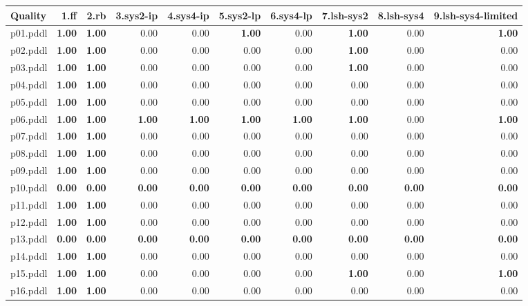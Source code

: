\documentclass{article}
\begin{document}
\begin{tabular}{@{}lrrrrrrrrr@{}}
Quality & 1.ff & 2.rb & 3.sys2-ip & 4.sys4-ip & 5.sys2-lp & 6.sys4-lp & 7.lsh-sys2 & 8.lsh-sys4 & 9.lsh-sys4-limited \\
\midrule
p01.pddl & \textbf{1.00} & \textbf{1.00} & 0.00 & 0.00 & \textbf{1.00} & 0.00 & \textbf{1.00} & 0.00 & \textbf{1.00} \\
p02.pddl & \textbf{1.00} & \textbf{1.00} & 0.00 & 0.00 & 0.00 & 0.00 & \textbf{1.00} & 0.00 & 0.00 \\
p03.pddl & \textbf{1.00} & \textbf{1.00} & 0.00 & 0.00 & 0.00 & 0.00 & \textbf{1.00} & 0.00 & 0.00 \\
p04.pddl & \textbf{1.00} & \textbf{1.00} & 0.00 & 0.00 & 0.00 & 0.00 & 0.00 & 0.00 & 0.00 \\
p05.pddl & \textbf{1.00} & \textbf{1.00} & 0.00 & 0.00 & 0.00 & 0.00 & 0.00 & 0.00 & 0.00 \\
p06.pddl & \textbf{1.00} & \textbf{1.00} & \textbf{1.00} & \textbf{1.00} & \textbf{1.00} & \textbf{1.00} & \textbf{1.00} & 0.00 & \textbf{1.00} \\
p07.pddl & \textbf{1.00} & \textbf{1.00} & 0.00 & 0.00 & 0.00 & 0.00 & 0.00 & 0.00 & 0.00 \\
p08.pddl & \textbf{1.00} & \textbf{1.00} & 0.00 & 0.00 & 0.00 & 0.00 & 0.00 & 0.00 & 0.00 \\
p09.pddl & \textbf{1.00} & \textbf{1.00} & 0.00 & 0.00 & 0.00 & 0.00 & 0.00 & 0.00 & 0.00 \\
p10.pddl & \textbf{0.00} & \textbf{0.00} & \textbf{0.00} & \textbf{0.00} & \textbf{0.00} & \textbf{0.00} & \textbf{0.00} & \textbf{0.00} & \textbf{0.00} \\
p11.pddl & \textbf{1.00} & \textbf{1.00} & 0.00 & 0.00 & 0.00 & 0.00 & 0.00 & 0.00 & 0.00 \\
p12.pddl & \textbf{1.00} & \textbf{1.00} & 0.00 & 0.00 & 0.00 & 0.00 & 0.00 & 0.00 & 0.00 \\
p13.pddl & \textbf{0.00} & \textbf{0.00} & \textbf{0.00} & \textbf{0.00} & \textbf{0.00} & \textbf{0.00} & \textbf{0.00} & \textbf{0.00} & \textbf{0.00} \\
p14.pddl & \textbf{1.00} & \textbf{1.00} & 0.00 & 0.00 & 0.00 & 0.00 & 0.00 & 0.00 & 0.00 \\
p15.pddl & \textbf{1.00} & \textbf{1.00} & 0.00 & 0.00 & 0.00 & 0.00 & \textbf{1.00} & 0.00 & \textbf{1.00} \\
p16.pddl & \textbf{1.00} & \textbf{1.00} & 0.00 & 0.00 & 0.00 & 0.00 & 0.00 & 0.00 & 0.00 \\

\end{tabular}
\end{document}
